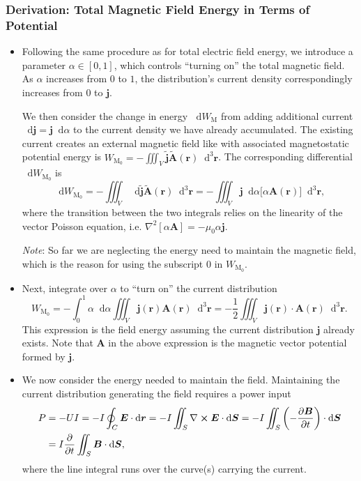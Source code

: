 \documentclass[11pt, a4paper]{article}
\newcommand{\diff}{\mathop{}\!\mathrm{d}} %
\newcommand{\dr}{\diff^{3} \r}  %
\renewcommand{\vec}[1]{\bm{#1}} %
\renewcommand{\r}{\vec{r}}
\newcommand{\E}{\vec{E}} %
\newcommand{\B}{\vec{B}} %
\newcommand{\A}{\vec{A}} %
\newcommand{\mm}{\mu_{0}}  %
\renewcommand{\j}{\vec{j}}  %
\renewcommand{\curl}{\nabla \cross}
\renewcommand{\laplacian}{\nabla^{2}}
\begin{document}
\subsubsection{Derivation: Total Magnetic Field Energy in Terms of Potential}
\begin{itemize}

    \item Following the same procedure as for total electric field energy, we introduce a parameter $ \alpha \in [0, 1] $, which controls ``turning on'' the total magnetic field. As $ \alpha $ increases from $ 0 $ to $ 1 $, the distribution's current density correspondingly increases from $ 0 $ to $ \j $.

    We then consider the change in energy $ \diff W_{\text{M}} $ from adding additional current $ \diff \j = \j \diff \alpha $ to the current density we have already accumulated. The existing current creates an external magnetic field like with associated magnetostatic potential energy is $ W_{\text{M}_{0}} = - \iiint_{V} \tilde{\j} \tilde{\A}(\r) \dr $. The corresponding differential $ \diff W_{\text{M}_{0}} $ is
    \begin{equation*}
        \diff W_{\text{M}_{0}} = - \iiint_{V} \diff \tilde{\j} \tilde{\A}(\r) \dr = - \iiint_{V} \j \diff \alpha \big[ \alpha \A(\r) \big] \dr,
    \end{equation*}
    where the transition between the two integrals relies on the linearity of the vector Poisson equation, i.e. $ \laplacian[\alpha \A] = - \mm \alpha \j $.

    \textit{Note}: So far we are neglecting the energy need to maintain the magnetic field, which is the reason for using the subscript $ 0 $ in $ W_{\text{M}_{0}} $.

    \item Next, integrate over $ \alpha $ to ``turn on'' the current distribution
    \begin{equation*}
        W_{\text{M}_{0}}  = - \int_{0}^{1} \alpha \diff \alpha \iiint_{V} \j(\r)\A(\r)\dr = - \frac{1}{2} \iiint_{V} \j(\r) \cdot \A(\r) \dr.
    \end{equation*}
    This expression is the field energy assuming the current distribution $ \j $ already exists. Note that $ \A $ in the above expression is the magnetic vector potential formed by $ \j $.
    
    \item We now consider the energy needed to maintain the field. Maintaining the current distribution generating the field requires a power input
    \begin{align*}
        P &= - UI = -I \oint_{C} \E \cdot \diff \r = - I \iint_{S} \curl \E \cdot \diff \vec{S} = - I \iint_{S} \left( - \pdv{\B}{t} \right) \cdot \diff \vec{S}\\
        &= I \pdv{t} \iint_{S} \B \cdot \diff \vec{S},
    \end{align*}
    where the line integral runs over the curve(s) carrying the current. 


\end{itemize}
\end{document}
